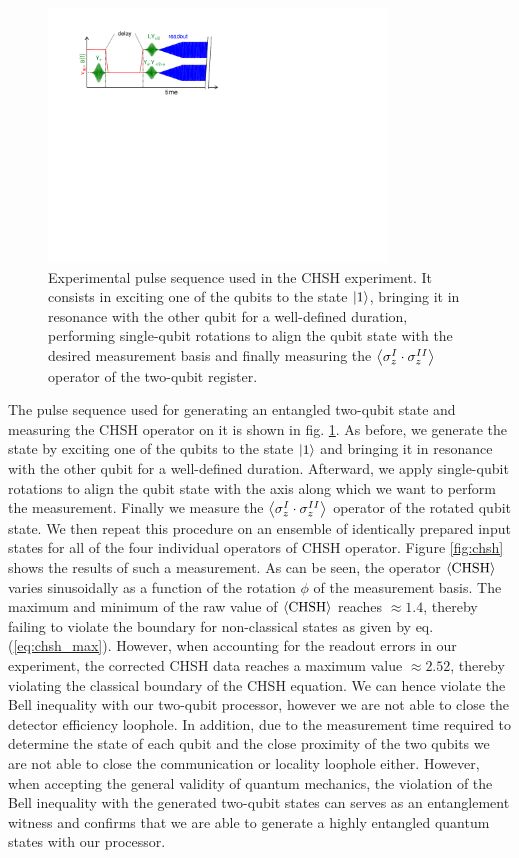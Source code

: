 \begin{figure}
	\centering
	\includegraphics[width=9cm]{"./material/figures/measurement/chsh"}
	\caption[]{Experimental pulse sequence used in the CHSH experiment. It consists in exciting one of the qubits to the state $\left| 1 \right>$, bringing it in resonance with the other qubit for a well-defined duration, performing single-qubit rotations to align the qubit state with the desired measurement basis and finally measuring the $\left< \sigma_z^I\cdot\sigma_z^{II} \right>$ operator of the two-qubit register.}
	\label{fig:chsh_pulse_sequence}
\end{figure}

The pulse sequence used for generating an entangled two-qubit state and measuring the CHSH operator on it is shown in fig. \ref{fig:chsh_pulse_sequence}. As before, we generate the state by exciting one of the qubits to the state $\left| 1 \right>$ and bringing it in resonance with the other qubit for a well-defined duration. Afterward, we apply single-qubit rotations to align the qubit state with the axis along which we want to perform the measurement. Finally we measure the $\left< \sigma_z^I\cdot \sigma_z^{II} \right>$ operator of the rotated qubit state. We then repeat this procedure on an ensemble of identically prepared input states for all of the four individual operators of CHSH operator. Figure \ref{fig:chsh} shows the results of such a measurement. As can be seen, the operator $\left< \mathrm{CHSH} \right>$ varies sinusoidally as a function of the rotation $\phi$ of the measurement basis. The maximum and minimum of the raw value of $\left< \mathrm{CHSH} \right>$ reaches $\approx 1.4$, thereby failing to violate the boundary for non-classical states as given by eq. (\ref{eq:chsh_max}). However, when accounting for the readout errors in our experiment, the corrected CHSH data reaches a maximum value $\approx 2.52$, thereby violating the classical boundary of the CHSH equation. We can hence violate the Bell inequality with our two-qubit processor, however we are not able to close the detector efficiency loophole. In addition, due to the measurement time required to determine the state of each qubit and the close proximity of the two qubits we are not able to close the communication or locality loophole either. However, when accepting the general validity of quantum mechanics, the violation of the Bell inequality with the generated two-qubit states can serves as an entanglement witness and confirms that we are able to generate a highly entangled quantum states with our processor.

